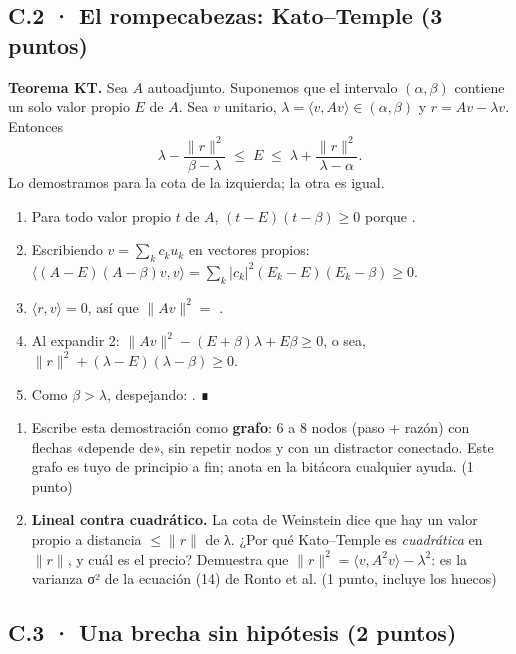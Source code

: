 \subsection{C.2 · El rompecabezas: Kato--Temple (3 puntos)}

\textbf{Teorema KT.} Sea $A$ autoadjunto. Suponemos que el intervalo $(\alpha, \beta)$ contiene un solo valor propio $E$ de $A$. Sea $v$ unitario, $\lambda = \langle v, Av\rangle \in (\alpha,\beta)$ y $r = Av - \lambda v$. Entonces
\[ \lambda - \frac{\|r\|^2}{\beta - \lambda} \;\le\; E \;\le\; \lambda + \frac{\|r\|^2}{\lambda - \alpha}. \]
Lo demostramos para la cota de la izquierda; la otra es igual.

\begin{enumerate}
\def\labelenumi{\arabic{enumi}.}
\item Para todo valor propio $t$ de $A$, $(t - E)(t - \beta) \ge 0$ porque .
\item Escribiendo $v = \sum_k c_k u_k$ en vectores propios: $\langle (A-E)(A-\beta)v, v\rangle = \sum_k |c_k|^2 (E_k - E)(E_k - \beta) \ge 0$.
\item $\langle r, v\rangle = 0$, así que $\|Av\|^2 = $ .
\item Al expandir 2: $\|Av\|^2 - (E + \beta)\lambda + E\beta \ge 0$, o sea, $\|r\|^2 + (\lambda - E)(\lambda - \beta) \ge 0$.
\item Como $\beta > \lambda$, despejando: . ∎
\end{enumerate}

\begin{enumerate}
\def\labelenumi{(\alph{enumi})}
\item Escribe esta demostración como \textbf{grafo}: 6 a 8 nodos (paso + razón) con flechas «depende de», sin repetir nodos y con un distractor conectado. Este grafo es tuyo de principio a fin; anota en la bitácora cualquier ayuda. (1 punto)
\item \textbf{Lineal contra cuadrático.} La cota de Weinstein dice que hay un valor propio a distancia $\le \|r\|$ de λ. ¿Por qué Kato--Temple es \emph{cuadrática} en $\|r\|$, y cuál es el precio? Demuestra que $\|r\|^2 = \langle v, A^2v\rangle - \lambda^2$: es la varianza σ² de la ecuación (14) de Ronto et al. (1 punto, incluye los huecos)
\end{enumerate}


\subsection{C.3 · Una brecha sin hipótesis (2 puntos)}

